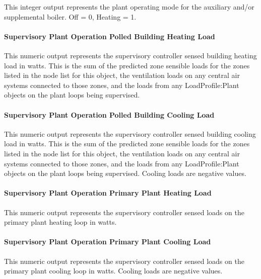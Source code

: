 This integer output represents the plant operating mode for the auxiliary and/or supplemental boiler. Off = 0, Heating = 1.

\paragraph{Supervisory Plant Operation Polled Building Heating Load}\label{operation-scheme-outputs-supervisory-plant-operation-sensed-heating-load}

This numeric output represents the supervisory controller sensed building heating load in watts.  This is the sum of the predicted zone sensible loads for the zones listed in the node list for this object, the ventilation loads on any central air systems connected to those zones, and the loads from any LoadProfile:Plant objects on the plant loops being supervised.

\paragraph{Supervisory Plant Operation Polled Building Cooling Load}\label{operation-scheme-outputs-supervisory-plant-operation-sensed-cooling-load}

This numeric output represents the supervisory controller sensed building cooling load in watts.  This is the sum of the predicted zone sensible loads for the zones listed in the node list for this object, the ventilation loads on any central air systems connected to those zones, and the loads from any LoadProfile:Plant objects on the plant loops being supervised. Cooling loads are negative values.

\paragraph{Supervisory Plant Operation Primary Plant Heating Load}\label{operation-scheme-outputs-supervisory-plant-heating-loads}

This numeric output represents the supervisory controller sensed loads on the primary plant heating loop in watts.

\paragraph{Supervisory Plant Operation Primary Plant Cooling Load}\label{operation-scheme-outputs-supervisory-plant-cooling-loads}

This numeric output represents the supervisory controller sensed loads on the primary plant cooling loop in watts.  Cooling loads are negative values.

